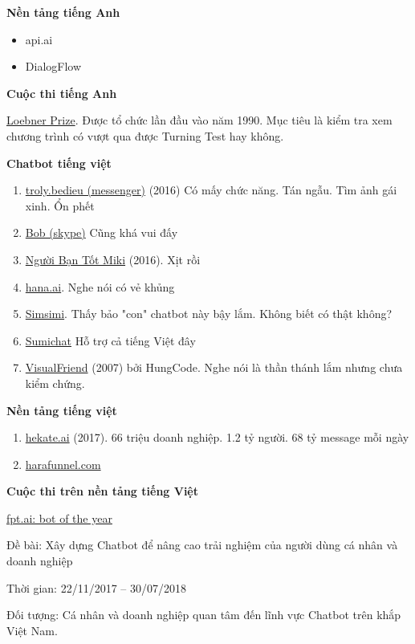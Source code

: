 \textbf{Nền tảng tiếng Anh}

\begin{itemize}
\item api.ai
\item DialogFlow
\end{itemize}

\textbf{Cuộc thi tiếng Anh}

\href{https://en.wikipedia.org/wiki/Loebner_Prize}{Loebner Prize}. Được tổ chức lần đầu vào năm 1990. Mục tiêu là kiểm tra xem chương trình có vượt qua được Turning Test hay không.

\textbf{Chatbot tiếng việt}

\begin{enumerate}
  \item \href{https://www.facebook.com/troly.bedieu/}{troly.bedieu (messenger)} (2016) Có mấy chức năng. Tán ngẫu. Tìm ảnh gái xinh. Ổn phết
  \item \href{https://chatbottle.co/bots/bob-for-skype}{Bob (skype)} Cũng khá vui đấy
  \item \href{https://www.facebook.com/2Miki/}{Người Bạn Tốt Miki} (2016). Xịt rồi
  \item \href{https://www.hana.ai/}{hana.ai}. Nghe nói có vẻ khủng
  \item \href{http://www.simsimi.com/otn/chatmode}{Simsimi}. Thấy bảo "con" chatbot này bậy lắm. Không biết có thật không?
  \item \href{http://sumichat.com/}{Sumichat} Hỗ trợ cả tiếng Việt đây 
  \item \href{http://www.vietarrow.com/tintuc/VisualFriend-tro-chuyen-voi-may-tinh-bang-tieng-Viet.html}{VisualFriend} (2007) bởi HungCode. Nghe nói là thần thánh lắm nhưng chưa kiểm chứng.
\end{enumerate}

\textbf{Nền tảng tiếng việt}

\begin{enumerate}
  \item \href{http://hekate.ai/}{hekate.ai} (2017). 66 triệu doanh nghiệp. 1.2 tỷ người. 68 tỷ message mỗi ngày
  \item \href{https://harafunnel.com/}{harafunnel.com}
\end{enumerate}

\textbf{Cuộc thi trên nền tảng tiếng Việt}

\href{https://fpt.ai/bot-of-the-year/}{fpt.ai: bot of the year}

Đề bài: Xây dựng Chatbot để nâng cao trải nghiệm của người dùng cá nhân và doanh nghiệp

Thời gian: 22/11/2017 – 30/07/2018

Đối tượng: Cá nhân và doanh nghiệp quan tâm đến lĩnh vực Chatbot trên khắp Việt Nam.
